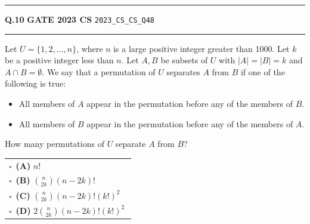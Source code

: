 \documentclass[a4paper,10pt]{article}
\begin{document}
\vspace{6pt}\hrule height 0.35pt\vspace{6pt}
\noindent
\begin{tcolorbox}[
    blanker,
    sidebyside,
    sidebyside align=top,
    lefthand width=0.55\textwidth,
    top=4pt, bottom=4pt, left=0pt, right=0pt,
    middle=16pt,
    underlay={
        \draw[dashed, black!80, line width=0.8pt, dash pattern=on 4pt off 3pt]
            ([xshift=0.55\textwidth+8pt]frame.north west) --
            ([xshift=0.55\textwidth+8pt]frame.south west);
    }
]
\textbf{Q.10}  \hfill {\footnotesize\textbf{GATE 2023 CS} \quad \tiny\texttt{2023\_CS\_CS\_Q48}}
\vspace{2pt}\hrule height 0.3pt\vspace{4pt}

Let $U = \{1, 2, \dots, n\}$, where $n$ is a large positive integer greater than 1000. Let $k$ be a positive integer less than $n$. Let $A, B$ be subsets of $U$ with $|A| = |B| = k$ and $A \cap B = \emptyset$. We say that a permutation of $U$ separates $A$ from $B$ if one of the following is true:
\begin{itemize}[itemsep=0pt,topsep=2pt]
\item All members of $A$ appear in the permutation before any of the members of $B$.
\item All members of $B$ appear in the permutation before any of the members of $A$.
\end{itemize}
How many permutations of $U$ separate $A$ from $B$?

\par\vspace{6pt}\noindent
\begin{tabular}{@{}p{0.98\linewidth}@{}}
$\square$\ \textbf{(A)} $n!$ \\
\addlinespace[3pt]
$\square$\ \textbf{(B)} $\binom{n}{2k} (n - 2k)!$ \\
\addlinespace[3pt]
$\square$\ \textbf{(C)} $\binom{n}{2k} (n - 2k)! (k!)^2$ \\
\addlinespace[3pt]
$\square$\ \textbf{(D)} $2 \binom{n}{2k} (n - 2k)! (k!)^2$
\end{tabular}

\tcblower


\end{tcolorbox}
\end{document}
